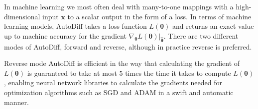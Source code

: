 In machine learning we most often deal with many-to-one mappings with a
high-dimensional input $\bm{x}$ to a scalar output in the form of a loss. In
terms of machine learning models, AutoDiff takes a loss function
$L(\bm{\theta})$ and returns an exact value up to machine accuracy for the
gradient $\nabla_{\bm{\theta}} L(\bm{\theta}) \vert_{\hat{\bm{\theta}}}$. There are
two different modes of AutoDiff, forward and reverse, although in practice
reverse is preferred.

Reverse mode AutoDiff is efficient in the way that calculating the gradient of
$L(\bm{\theta})$ is guaranteed to take at most 5 times the time it takes to
compute $L(\bm{\theta})$ \cite{Barber15deeplearning:}, enabling neural network
libraries to calculate the gradients needed for optimization algorithms such as
SGD and ADAM in a swift and automatic manner.
